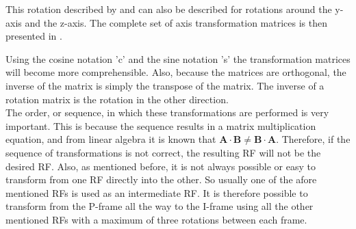 \noindent
This rotation described by  and  can also be described for rotations around the y-axis and the z-axis. The complete set of axis transformation matrices is then presented in .

Using the cosine notation 'c' and the sine notation 's' the transformation matrices will become more comprehensible. Also, because the matrices are orthogonal, the inverse of the matrix is simply the transpose of the matrix. The inverse of a rotation matrix is the rotation in the other direction.\\
The order, or sequence, in which these transformations are performed is very important. This is because the sequence results in a matrix multiplication equation, and from linear algebra it is known that $\mathbf{A}\cdot\mathbf{B}\neq\mathbf{B}\cdot\mathbf{A}$. Therefore, if the sequence of transformations is not correct, the resulting \ac{RF} will not be the desired \ac{RF}.  Also, as mentioned before, it is not always possible or easy to transform from one \ac{RF} directly into the other. So usually one of the afore mentioned \ac{RF}s is used as an intermediate \ac{RF}. It is therefore possible to transform from the P-frame all the way to the I-frame using all the other mentioned \ac{RF}s with a maximum of three rotations between each frame. 

